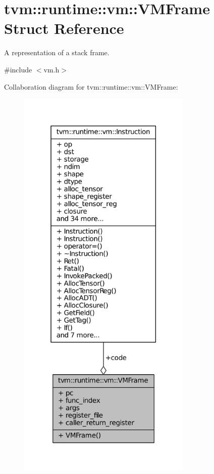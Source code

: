 \hypertarget{structtvm_1_1runtime_1_1vm_1_1VMFrame}{}\section{tvm\+:\+:runtime\+:\+:vm\+:\+:V\+M\+Frame Struct Reference}
\label{structtvm_1_1runtime_1_1vm_1_1VMFrame}


A representation of a stack frame.  




{\ttfamily \#include $<$vm.\+h$>$}



Collaboration diagram for tvm\+:\+:runtime\+:\+:vm\+:\+:V\+M\+Frame\+:
\nopagebreak
\begin{figure}[H]
\begin{center}
\leavevmode
\includegraphics[height=550pt]{structtvm_1_1runtime_1_1vm_1_1VMFrame__coll__graph}
\end{center}
\end{figure}
